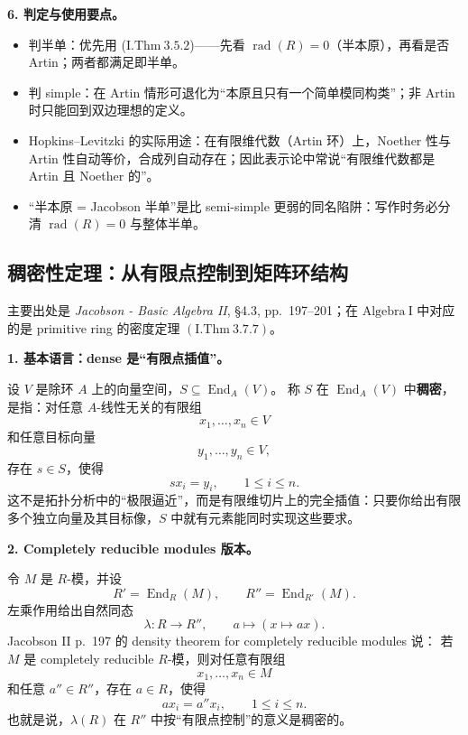 \documentclass[a4paper]{ctexart}
\theoremstyle{definition}
\theoremstyle{analysis}
\theoremstyle{plain}
\begin{document}
\textbf{6. 判定与使用要点。}

\begin{itemize}
  \item 判半单：优先用 (\(\mathrm{I.Thm}\ 3.5.2\))——先看 \(\operatorname{rad}(R)=0\)（半本原），再看是否 Artin；两者都满足即半单。
  \item 判 simple：在 Artin 情形可退化为“本原且只有一个简单模同构类”；非 Artin 时只能回到双边理想的定义。
  \item Hopkins--Levitzki 的实际用途：在有限维代数（Artin 环）上，Noether 性与 Artin 性自动等价，合成列自动存在；因此表示论中常说“有限维代数都是 Artin 且 Noether 的”。
  \item “半本原 = Jacobson 半单”是比 semi-simple 更弱的同名陷阱：写作时务必分清 \(\operatorname{rad}(R)=0\) 与整体半单。
\end{itemize}

\subsection{稠密性定理：从有限点控制到矩阵环结构}\label{subsec:topic-density-theorem}

主要出处是 \textit{Jacobson - Basic Algebra II}, \S 4.3, pp.~197--201；在
\(\mathrm{Algebra\ I}\) 中对应的是 primitive ring 的密度定理
\((\mathrm{I.Thm}\ 3.7.7)\)。

\medskip

\textbf{1. 基本语言：dense 是“有限点插值”。}

设 \(V\) 是除环 \(A\) 上的向量空间，\(S\subseteq \operatorname{End}_A(V)\)。
称 \(S\) 在 \(\operatorname{End}_A(V)\) 中\textbf{稠密}，是指：对任意
\(A\)-线性无关的有限组
\[
  x_1,\dots,x_n\in V
\]
和任意目标向量
\[
  y_1,\dots,y_n\in V,
\]
存在 \(s\in S\)，使得
\[
  sx_i=y_i,\qquad 1\le i\le n.
\]
这不是拓扑分析中的“极限逼近”，而是有限维切片上的完全插值：只要你给出有限多个独立向量及其目标像，\(S\) 中就有元素能同时实现这些要求。

\medskip

\textbf{2. Completely reducible modules 版本。}

令 \(M\) 是 \(R\)-模，并设
\[
  R'=\operatorname{End}_R(M),\qquad
  R''=\operatorname{End}_{R'}(M).
\]
左乘作用给出自然同态
\[
  \lambda:R\longrightarrow R'',\qquad
  a\longmapsto (x\mapsto ax).
\]
Jacobson II p.~197 的 density theorem for completely reducible modules 说：
若 \(M\) 是 completely reducible \(R\)-模，则对任意有限组
\[
  x_1,\dots,x_n\in M
\]
和任意 \(a''\in R''\)，存在 \(a\in R\)，使得
\[
  ax_i=a''x_i,\qquad 1\le i\le n.
\]
也就是说，\(\lambda(R)\) 在 \(R''\) 中按“有限点控制”的意义是稠密的。
\end{document}
